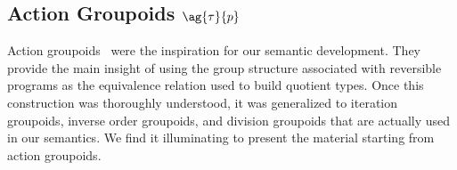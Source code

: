 














\subsection{Action Groupoids $\ag{\tau}{p}$}

Action groupoids~\cite{groupoidintro} were the inspiration for our
semantic development. They provide the main insight of using the
group structure associated with reversible programs as the equivalence
relation used to build quotient types. Once this construction was
thoroughly understood, it was generalized to iteration groupoids,
inverse order groupoids, and division groupoids that are actually used
in our semantics. We find it illuminating to present the material
starting from action groupoids.

